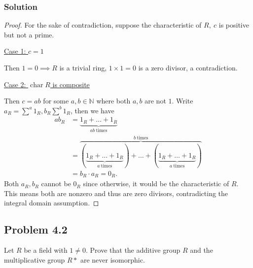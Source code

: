 \documentclass{article}
\theoremstyle{plain}
\newcommand{\N}{\mathbb{N}}
\DeclareMathOperator{\chr}{char}
\begin{document}
\subsubsection*{Solution}
\begin{proof}
  For the sake of contradiction, suppose the characteristic of $R,\ c$ is positive
  but not a prime.\medskip

  \underline{Case 1: $c=1$}

  Then $1=0\implies R$ is a trivial ring, $1\times1=0$ is a zero divisor, a contradiction.\medskip

  \underline{Case 2: $\chr R$ is composite}

  Then $c=ab$ for some $a, b\in\N$ where both $a, b$ are not $1$. Write
  $a_{R}=\sum^{a}1_{R}, b_{R}\sum^{b}1_{R}$, then we have
  \begin{align*}
    ab_{R} &= \underbrace{1_{R}+\ldots+1_{R}}_{ab\ \text{times}}\\
    &= \overbrace{(\underbrace{1_{R}+\ldots+1_{R}}_{a\ \text{times}})+\ldots+(\underbrace{1_{R}+\ldots+1_{R}}_{a\ \text{times}})}^{b\ \text{times}}\\
    &=b_{R}\cdot a_{R}=0_{R}.
  \end{align*}
  Both $a_{R}, b_{R}$ cannot be $0_{R}$ since otherwise, it would be the
  characteristic of $R$. This means both are nonzero and thus are zero divisors,
  contradicting the integral domain assumption.

\end{proof}
\subsection*{Problem 4.2}
Let $R$ be a field with $1\ne0$. Prove that the additive group $R$ and the
multiplicative group $R*$ are never isomorphic.
\end{document}
